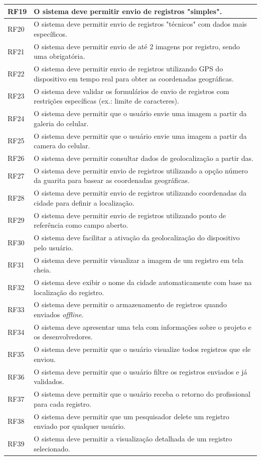\begin{longtable}{@{}p{1.5cm}p{13cm}@{}}
    RF19 & O sistema deve permitir envio de registros "simples". \\ \hline
    RF20 & O sistema deve permitir envio de registros "técnicos" com dados mais específicos. \\ \hline
    RF21 & O sistema deve permitir envio de até 2 imagens por registro, sendo uma obrigatória. \\ \hline
    RF22 & O sistema deve permitir envio de registros utilizando GPS do dispositivo em tempo real para obter as coordenadas geográficas. \\ \hline
    RF23 & O sistema deve validar os formulários de envio de registros com restrições específicas (ex.: limite de caracteres). \\ \hline
    RF24 & O sistema deve permitir que o usuário envie uma imagem a partir da galeria do celular. \\ \hline
    RF25 & O sistema deve permitir que o usuário envie uma imagem a partir da camera do celular. \\ \hline
    RF26 & O sistema deve permitir consultar dados de geolocalização a partir das. \\ \hline
    RF27 & O sistema deve permitir envio de registros utilizando a opção número da guarita para basear as coordenadas geográficas. \\ \hline
    RF28 & O sistema deve permitir envio de registros utilizando coordenadas da cidade para definir a localização. \\ \hline
    RF29 & O sistema deve permitir envio de registros utilizando ponto de referência como campo aberto. \\ \hline
    RF30 & O sistema deve facilitar a ativação da geolocalização do dispositivo pelo usuário. \\ \hline
    RF31 & O sistema deve permitir visualizar a imagem de um registro em tela cheia. \\ \hline
    RF32 & O sistema deve exibir o nome da cidade automaticamente com base na localização do registro. \\ \hline
    RF33 & O sistema deve permitir o armazenamento de registros quando enviados \textit{offline}. \\ \hline

    RF34 & O sistema deve apresentar uma tela com informações sobre o projeto e os desenvolvedores. \\ \hline

    RF35 & O sistema deve permitir que o usuário visualize todos registros que ele enviou. \\ \hline
    RF36 & O sistema deve permitir que o usuário filtre os registros enviados e já validados. \\ \hline
    RF37 & O sistema deve permitir que o usuário receba o retorno do profissional para cada registro. \\ \hline
    RF38 & O sistema deve permitir que um pesquisador delete um registro enviado por qualquer usuário. \\ \hline
    RF39 & O sistema deve permitir a visualização detalhada de um registro selecionado. \\ \hline
    

\end{longtable}
